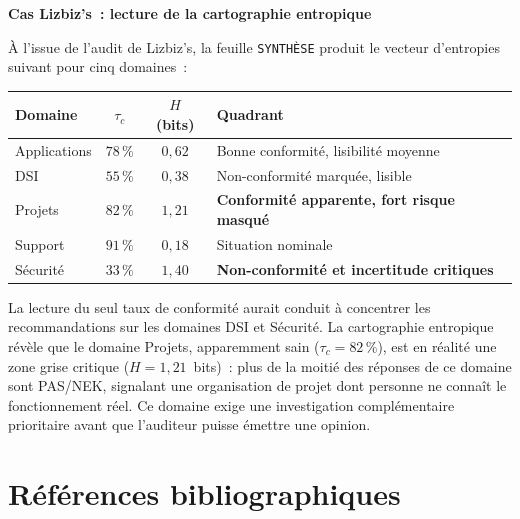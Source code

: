 \begin{boxlizbiz}
\textbf{Cas Lizbiz's~: lecture de la cartographie entropique}

À l'issue de l'audit de Lizbiz's, la feuille \texttt{SYNTHÈSE} produit le
vecteur d'entropies suivant pour cinq domaines~:

\smallskip
\begin{tabular}{lccl}
\toprule
\textbf{Domaine} & $\tau_c$ & $H$ (bits) & \textbf{Quadrant} \\
\midrule
Applications & $78\,\%$ & $0{,}62$ & Bonne conformité, lisibilité moyenne \\
DSI & $55\,\%$ & $0{,}38$ & Non-conformité marquée, lisible \\
Projets & $82\,\%$ & $1{,}21$ & \textbf{Conformité apparente, fort risque masqué} \\
Support & $91\,\%$ & $0{,}18$ & Situation nominale \\
Sécurité & $33\,\%$ & $1{,}40$ & \textbf{Non-conformité et incertitude critiques} \\
\bottomrule
\end{tabular}

\smallskip
La lecture du seul taux de conformité aurait conduit à concentrer les
recommandations sur les domaines DSI et Sécurité. La cartographie entropique
révèle que le domaine Projets, apparemment sain ($\tau_c = 82\,\%$), est en
réalité une zone grise critique ($H = 1{,}21$~bits)~: plus de la moitié des
réponses de ce domaine sont PAS/NEK, signalant une organisation de projet dont
personne ne connaît le fonctionnement réel. Ce domaine exige une investigation
complémentaire prioritaire avant que l'auditeur puisse émettre une opinion.
\end{boxlizbiz}

\section*{Références bibliographiques}


